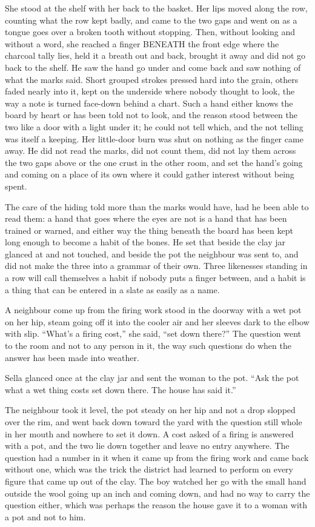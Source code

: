 She stood at the shelf with her back to the basket. Her lips moved along the row, counting what the row kept badly, and came to the two gaps and went on as a tongue goes over a broken tooth without stopping. Then, without looking and without a word, she reached a finger BENEATH the front edge where the charcoal tally lies, held it a breath out and back, brought it away and did not go back to the shelf. He saw the hand go under and come back and saw nothing of what the marks said. Short grouped strokes pressed hard into the grain, others faded nearly into it, kept on the underside where nobody thought to look, the way a note is turned face-down behind a chart. Such a hand either knows the board by heart or has been told not to look, and the reason stood between the two like a door with a light under it; he could not tell which, and the not telling was itself a keeping. Her little-door burn was shut on nothing as the finger came away. He did not read the marks, did not count them, did not lay them across the two gaps above or the one crust in the other room, and set the hand's going and coming on a place of its own where it could gather interest without being spent.

The care of the hiding told more than the marks would have, had he been able to read them: a hand that goes where the eyes are not is a hand that has been trained or warned, and either way the thing beneath the board has been kept long enough to become a habit of the bones. He set that beside the clay jar glanced at and not touched, and beside the pot the neighbour was sent to, and did not make the three into a grammar of their own. Three likenesses standing in a row will call themselves a habit if nobody puts a finger between, and a habit is a thing that can be entered in a slate as easily as a name.

A neighbour come up from the firing work stood in the doorway with a wet pot on her hip, steam going off it into the cooler air and her sleeves dark to the elbow with slip. “What's a firing cost,” she said, “set down there?” The question went to the room and not to any person in it, the way such questions do when the answer has been made into weather.

Sella glanced once at the clay jar and sent the woman to the pot. “Ask the pot what a wet thing costs set down there. The house has said it.”

The neighbour took it level, the pot steady on her hip and not a drop slopped over the rim, and went back down toward the yard with the question still whole in her mouth and nowhere to set it down. A cost asked of a firing is answered with a pot, and the two lie down together and leave no entry anywhere. The question had a number in it when it came up from the firing work and came back without one, which was the trick the district had learned to perform on every figure that came up out of the clay. The boy watched her go with the small hand outside the wool going up an inch and coming down, and had no way to carry the question either, which was perhaps the reason the house gave it to a woman with a pot and not to him.

